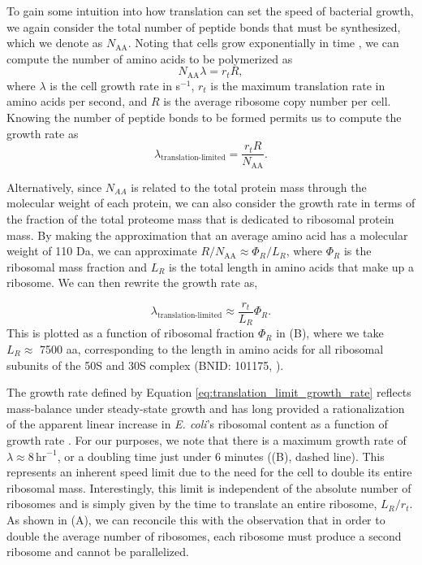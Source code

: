 To gain some intuition into how translation can set the speed of
bacterial growth, we again consider the total number of peptide bonds that must
be synthesized, which we denote as $N_\text{AA}$. Noting that cells grow exponentially in time
\citep{godin2010}, we can compute the number of amino acids to be polymerized as
\begin{equation} N_\text{AA} \lambda = r_t R, \end{equation} where
$\lambda$ is the cell growth rate in s$^{-1}$, $r_t$ is the maximum translation
rate in amino acids per second, and $R$ is the average ribosome copy number per
cell. Knowing the number of peptide bonds to be formed permits us to compute the
 growth rate as
\begin{equation}
\lambda_\text{translation-limited} = \frac{r_t R}{N_\text{AA}}.
\end{equation}

Alternatively, since $N_{AA}$ is related to the total protein mass through the
molecular weight of each protein, we can also consider the growth rate in terms
of the fraction of the total proteome mass that is dedicated to ribosomal
protein mass. By making the approximation that an average amino acid has a
molecular weight of 110 Da, we can approximate  $R
/ N_\text{AA} \approx \Phi_R / L_R$,  where $\Phi_R$ is the ribosomal mass
fraction and $L_R$ is the total length in amino acids that make up a ribosome.
We can then rewrite the growth rate as,

\begin{equation}
\lambda_{\textrm{translation-limited}} \approx \frac{r_t}{L_R}  \Phi_R.
\label{eq:translation_limit_growth_rate}
\end{equation}
This is plotted as a function of ribosomal fraction $\Phi_R$ in
(B), where we take $L_R \approx$ 7500 aa, corresponding to
the length in amino acids for all ribosomal subunits of the 50S and 30S complex
(BNID: 101175, \citep{milo2010}).

The growth rate defined by Equation \ref{eq:translation_limit_growth_rate}
reflects mass-balance under steady-state growth and has long provided a
rationalization of the apparent linear increase in \textit{E. coli}'s ribosomal
content as a function of growth rate \citep{Goldberger1979, scott2010}. For our
purposes, we note that there is a maximum growth rate of $\lambda \approx 8
\,\text{hr}^{-1}$, or a doubling time just under 6 minutes
((B), dashed line). This represents an inherent speed limit
due to the need for the cell to double its entire ribosomal mass. Interestingly,
this limit is independent of the absolute number of ribosomes and is simply
given by the time to translate an entire ribosome, $L_R/ r_t$. As shown in
(A), we can reconcile this with the observation that in
order to double the average number of ribosomes, each ribosome must produce a
second ribosome and cannot be parallelized.

